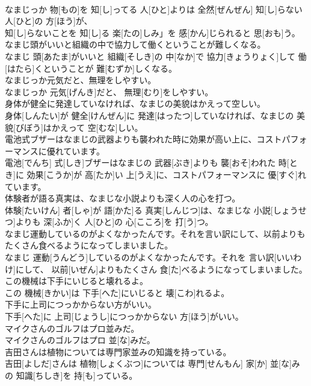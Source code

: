 \documentclass[8pt]{extreport}
\begin{document}
\begin{CJK}{UTF8}{min}
\\	なまじっか 物[もの]を 知[し]ってる 人[ひと]よりは 全然[ぜんぜん] 知[し]らない 人[ひと]の 方[ほう]が、
\\	知[し]らないことを 知[し]る 楽[たの]しみ」を 感[かん]じられると 思[おも]う。
\\	なまじ頭がいいと組織の中で協力して働くということが難しくなる。	
\\	なまじ 頭[あたま]がいいと 組織[そしき]の 中[なか]で 協力[きょうりょく]して 働[はたら]くということが 難[むずか]しくなる。
\\	なまじっか元気だと、無理をしやすい。	
\\	なまじっか 元気[げんき]だと、 無理[むり]をしやすい。
\\	身体が健全に発達していなければ、なまじの美貌はかえって空しい。	
\\	身体[しんたい]が 健全[けんぜん]に 発達[はったつ]していなければ、なまじの 美貌[びぼう]はかえって 空[むな]しい。
\\	電池式ブザーはなまじの武器よりも襲われた時に効果が高い上に、コストパフォーマンスに優れています。	
\\	電池[でんち] 式[しき]ブザーはなまじの 武器[ぶき]よりも 襲[おそ]われた 時[とき]に 効果[こうか]が 高[たか]い 上[うえ]に、コストパフォーマンスに 優[すぐ]れています。
\\	体験者が語る真実は、なまじな小説よりも深く人の心を打つ。	
\\	体験[たいけん] 者[しゃ]が 語[かた]る 真実[しんじつ]は、なまじな 小説[しょうせつ]よりも 深[ふか]く 人[ひと]の 心[こころ]を 打[う]つ。
\\	なまじ運動しているのがよくなかったんです。それを言い訳にして、以前よりもたくさん食べるようになってしまいました。	
\\	なまじ 運動[うんどう]しているのがよくなかったんです。それを 言い訳[いいわけ]にして、 以前[いぜん]よりもたくさん 食[た]べるようになってしまいました。
\\	この機械は下手にいじると壊れるよ。	
\\	この 機械[きかい]は 下手[へた]にいじると 壊[こわ]れるよ。
\\	下手に上司につっかからない方がいい。	
\\	下手[へた]に 上司[じょうし]につっかからない 方[ほう]がいい。
\\	マイクさんのゴルフはプロ並みだ。	
\\	マイクさんのゴルフはプロ 並[な]みだ。
\\	吉田さんは植物については専門家並みの知識を持っている。	
\\	吉田[よしだ]さんは 植物[しょくぶつ]については 専門[せんもん] 家[か] 並[な]みの 知識[ちしき]を 持[も]っている。

\end{CJK}
\end{document}
